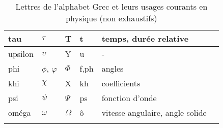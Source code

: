 \begin{table}[!h]
\begin{tabular}{M{1.75cm}M{1.75cm}M{1.75cm}M{3.75cm}M{3.75cm}N}
    \hline
    tau & $\tau$ & T & t & temps, durée relative  & \\[0.5em]
    \hline
    upsilon & $\upsilon$ & Y & u & -  & \\[0.5em]
    \hline
    phi & $\phi$, $\varphi$ & $\Phi$ & f,ph & angles   & \\[0.5em]
    \hline
    khi & $\chi$ & X  & kh & coefficients   & \\[0.5em]
    \hline
    psi & $\psi$ & $\Psi$ & ps & fonction d'onde   & \\[0.5em]
    \hline
    oméga & $\omega$ & $\Omega$ & ô & vitesse angulaire, angle solide   & \\[0.5em]
    \hhline{=====}
\end{tabular}
	\caption{Lettres de l'alphabet Grec et leurs usages courants en physique (non exhaustifs)}
\end{table}

